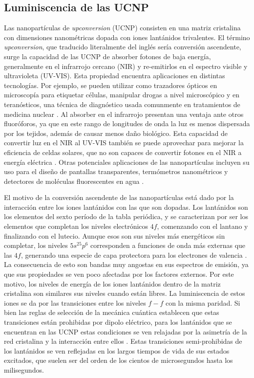 \subsection{Luminiscencia de las UCNP}

Las nanopartículas de \textit{upconversion} (UCNP) consisten en una matriz cristalina con dimensiones nanométricas dopada con iones lantánidos trivalentes.
El término \textit{upconversion}, que traducido literalmente del inglés sería conversión ascendente, surge la capacidad de las UCNP de absorber fotones de baja energía, generalmente en el infrarrojo cercano (NIR) y re-emitirlos en el espectro visible y ultravioleta (UV-VIS).
Esta propiedad encuentra aplicaciones en distintas tecnologías.
Por ejemplo, se pueden utilizar como trazadores ópticos en microscopía para etiquetar células, manipular drogas a nivel microscópico y en teranósticos, una técnica de diagnóstico usada comunmente en tratamientos de medicina nuclear \cite{shen_lanthanidedoped_2013,guryev_ucnpbased_2020,haase_upconverting_2011}.
Al absorber en el infrarrojo presentan una ventaja ante otros fluoróforos, ya que en este rango de longitudes de onda la luz es menos dispersada por los tejidos, además de causar menos daño biológico.
Esta capacidad de convertir luz en el NIR al UV-VIS también se puede aprovechar para mejorar la eficiencia de celdas solares, que no son capaces de convertir fotones en el NIR a energía eléctrica \cite{hao_enhancing_2017}.
Otras potenciales aplicaciones de las nanopartículas incluyen su uso para el diseño de pantallas transparentes, termómetros nanométricos y detectores de moléculas fluorescentes en agua \cite{hong_orthogonal_2021,savchuk_thermochromic_2016, bujjamer_first_2021}.

El motivo de la conversión ascendente de las nanopartículas está dado por la interacción entre los iones lantánidos con las que son dopadas.
Los lantánidos son los elementos del sexto período de la tabla periódica, y se caracterizan por ser los elementos que completan los niveles electrónicos $4f$, comenzando con el lantano y finalizando con el lutecio.
Aunque esos son sus niveles más energéticos sin completar, los niveles $5s^25p^6$ corresponden a funciones de onda más externas que las $4f$, generando una especie de capa protectora para los electrones de valencia \cite{lanthanides}.
La consecuencia de esto son bandas muy angostas en sus espectros de emisión, ya que sus propiedades se ven poco afectadas por los factores externos. 
Por este motivo, los niveles de energía de los iones lantánidos dentro de la matriz cristalina son similares sus niveles cuando están libres\cite{nadort_lanthanide_2016}.
La luminiscencia de estos iones se da por las transiciones entre los niveles $f-f$ con la misma paridad.
Si bien las reglas de selección de la mecánica cuántica establecen que estas transiciones están prohibidas por dipolo eléctrico, para los lantánidos que se encuentran en las UCNP estas condiciones se ven relajadas por la asimetría de la red cristalina y la interacción entre ellos \cite{basics_of_lanthanide}.
Estas transiciones semi-prohibidas de los lantánidos se ven reflejadas en los largos tiempos de vida de sus estados excitados, que suelen ser del orden de los cientos de microsegundos hasta los milisegundos.

